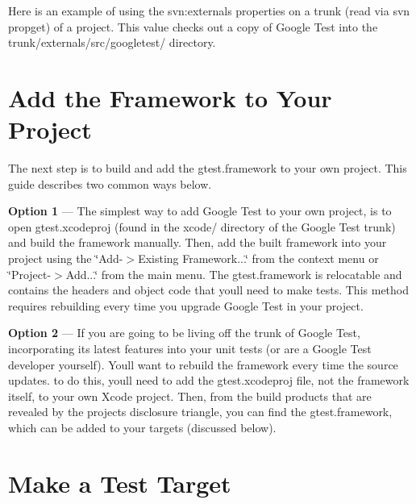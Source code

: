 Here is an example of using the svn\+:externals properties on a trunk (read via {\ttfamily svn propget}) of a project. This value checks out a copy of Google Test into the {\ttfamily trunk/externals/src/googletest/} directory.




\section*{Add the Framework to Your Project}

The next step is to build and add the gtest.\+framework to your own project. This guide describes two common ways below.


\begin{DoxyItemize}
\item {\bfseries Option 1} --- The simplest way to add Google Test to your own project, is to open gtest.\+xcodeproj (found in the xcode/ directory of the Google Test trunk) and build the framework manually. Then, add the built framework into your project using the \char`\"{}\+Add-\/$>$\+Existing Framework...\char`\"{} from the context menu or \char`\"{}\+Project-\/$>$\+Add...\char`\"{} from the main menu. The gtest.\+framework is relocatable and contains the headers and object code that you\textquotesingle{}ll need to make tests. This method requires rebuilding every time you upgrade Google Test in your project.
\item {\bfseries Option 2} --- If you are going to be living off the trunk of Google Test, incorporating its latest features into your unit tests (or are a Google Test developer yourself). You\textquotesingle{}ll want to rebuild the framework every time the source updates. to do this, you\textquotesingle{}ll need to add the gtest.\+xcodeproj file, not the framework itself, to your own Xcode project. Then, from the build products that are revealed by the project\textquotesingle{}s disclosure triangle, you can find the gtest.\+framework, which can be added to your targets (discussed below).
\end{DoxyItemize}

\section*{Make a Test Target}

